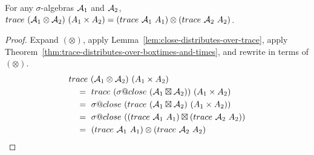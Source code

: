 \documentclass[preprint]{sigplanconf}
\begin{document}
\begin{theorem}
For any $\sigma$-algebras $\mathcal{A}_1$ and $\mathcal{A}_2$, $trace~(\mathcal{A}_1 \otimes \mathcal{A}_2)~(A_1 \times A_2) = (trace~\mathcal{A}_1~A_1) \otimes (trace~\mathcal{A}_2~A_2)$.
\label{thm:trace-distributes-over-otimes-and-times}
\end{theorem}
\begin{proof}
Expand $(\otimes)$, apply Lemma~\ref{lem:close-distributes-over-trace}, apply Theorem~\ref{thm:trace-distributes-over-boxtimes-and-times}, and rewrite in terms of $(\otimes)$.
\begin{align*}
	&trace~(\A_1 \otimes \A_2)~(A_1 \times A_2)
\\
	&\tab = \ trace~(\sigma@close~(\A_1 \boxtimes \A_2))~(A_1 \times A_2)
\\
	&\tab = \ \sigma@close~(trace~(\A_1 \boxtimes \A_2)~(A_1 \times A_2))
\\
	&\tab = \ \sigma@close~((trace~\A_1~A_1) \boxtimes (trace~\A_2~A_2))
\\
	&\tab = \ (trace~\A_1~A_1) \otimes (trace~\A_2~A_2)
\end{align*}
\end{proof}
\end{document}
